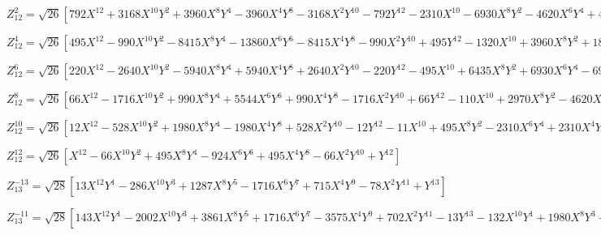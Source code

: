 \documentclass[10pt,landscape]{article}
\begin{document}
\vspace{1.2 mm}
\noindent $ Z^{2}_{12} = \sqrt{26} [792X^{12} +3168X^{10}Y^{2} +3960X^{8}Y^{4} -3960X^{4}Y^{8} -3168X^{2}Y^{10} -792Y^{12} -2310X^{10} -6930X^{8}Y^{2} -4620X^{6}Y^{4} +4620X^{4}Y^{6} +6930X^{2}Y^{8} +2310Y^{10} +2520X^{8} +5040X^{6}Y^{2} -5040X^{2}Y^{6} -2520Y^{8} -1260X^{6} -1260X^{4}Y^{2} +1260X^{2}Y^{4} +1260Y^{6} +280X^{4} -280Y^{4} -21X^{2} +21Y^{2}] $

\vspace{1.2 mm}
\noindent $ Z^{4}_{12} = \sqrt{26} [495X^{12} -990X^{10}Y^{2} -8415X^{8}Y^{4} -13860X^{6}Y^{6} -8415X^{4}Y^{8} -990X^{2}Y^{10} +495Y^{12} -1320X^{10} +3960X^{8}Y^{2} +18480X^{6}Y^{4} +18480X^{4}Y^{6} +3960X^{2}Y^{8} -1320Y^{10} +1260X^{8} -5040X^{6}Y^{2} -12600X^{4}Y^{4} -5040X^{2}Y^{6} +1260Y^{8} -504X^{6} +2520X^{4}Y^{2} +2520X^{2}Y^{4} -504Y^{6} +70X^{4} -420X^{2}Y^{2} +70Y^{4}] $

\vspace{1.2 mm}
\noindent $ Z^{6}_{12} = \sqrt{26} [220X^{12} -2640X^{10}Y^{2} -5940X^{8}Y^{4} +5940X^{4}Y^{8} +2640X^{2}Y^{10} -220Y^{12} -495X^{10} +6435X^{8}Y^{2} +6930X^{6}Y^{4} -6930X^{4}Y^{6} -6435X^{2}Y^{8} +495Y^{10} +360X^{8} -5040X^{6}Y^{2} +5040X^{2}Y^{6} -360Y^{8} -84X^{6} +1260X^{4}Y^{2} -1260X^{2}Y^{4} +84Y^{6}] $

\vspace{1.2 mm}
\noindent $ Z^{8}_{12} = \sqrt{26} [66X^{12} -1716X^{10}Y^{2} +990X^{8}Y^{4} +5544X^{6}Y^{6} +990X^{4}Y^{8} -1716X^{2}Y^{10} +66Y^{12} -110X^{10} +2970X^{8}Y^{2} -4620X^{6}Y^{4} -4620X^{4}Y^{6} +2970X^{2}Y^{8} -110Y^{10} +45X^{8} -1260X^{6}Y^{2} +3150X^{4}Y^{4} -1260X^{2}Y^{6} +45Y^{8}] $

\vspace{1.2 mm}
\noindent $ Z^{10}_{12} = \sqrt{26} [12X^{12} -528X^{10}Y^{2} +1980X^{8}Y^{4} -1980X^{4}Y^{8} +528X^{2}Y^{10} -12Y^{12} -11X^{10} +495X^{8}Y^{2} -2310X^{6}Y^{4} +2310X^{4}Y^{6} -495X^{2}Y^{8} +11Y^{10}] $

\vspace{1.2 mm}
\noindent $ Z^{12}_{12} = \sqrt{26} [X^{12} -66X^{10}Y^{2} +495X^{8}Y^{4} -924X^{6}Y^{6} +495X^{4}Y^{8} -66X^{2}Y^{10} +Y^{12}] $

\vspace{1.2 mm}
\noindent $ Z^{-13}_{13} = \sqrt{28} [13X^{12}Y^{1} -286X^{10}Y^{3} +1287X^{8}Y^{5} -1716X^{6}Y^{7} +715X^{4}Y^{9} -78X^{2}Y^{11} +Y^{13}] $

\vspace{1.2 mm}
\noindent $ Z^{-11}_{13} = \sqrt{28} [143X^{12}Y^{1} -2002X^{10}Y^{3} +3861X^{8}Y^{5} +1716X^{6}Y^{7} -3575X^{4}Y^{9} +702X^{2}Y^{11} -13Y^{13} -132X^{10}Y^{1} +1980X^{8}Y^{3} -5544X^{6}Y^{5} +3960X^{4}Y^{7} -660X^{2}Y^{9} +12Y^{11}] $
\end{document}

